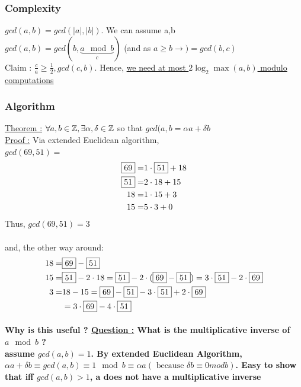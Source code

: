 \documentclass[12pt,a4paper]{article}
\begin{document}
\subsubsection{Complexity}
$gcd(a,b) = gcd(|a|,|b|)$. We can assume a,b \\
$gcd(a,b) = gcd(b,\underbrace{a\mod b}_{c})$ (and as $a\geq b \to ) = gcd(b,c)$\\
Claim : $\frac{c}{a} \geq \frac{1}{2}, gcd(c,b)$. Hence, \underline{we need at most $2\log_2 \max(a,b)$ modulo computations}
\subsubsection{Algorithm}
\underline{Theorem :} $\forall a,b \in \mathbb{Z}, \exists \alpha, \delta \in \mathbb{Z}$ so that $gcd(a,b= \alpha a + \delta b$\\
\underline{Proof :} Via extended Euclidean algorithm,\\
$gcd(69,51) =$
\begin{align*}
\fbox{69} =& 1\cdot \fbox{51}+ 18\\
\fbox{51} =& 2\cdot 18 + 15\\
18 =& 1\cdot 15+ 3\\
15 =& 5 \cdot 3  + 0
\end{align*}
Thus, $gcd(69,51) = 3$\\
\\
and, the other way around:
\begin{align*}
18 =& \fbox{69}-\fbox{51}\\
15 = & \fbox{51} - 2 \cdot 18 = \fbox{51}-2\cdot(\fbox{69}-\fbox{51}) = 3 \cdot \fbox{51} - 2\cdot \fbox{69}\\
3 =& 18-15 = \fbox{69}-\fbox{51} - 3 \cdot \fbox{51}+ 2\cdot \fbox{69}\\
&=3\cdot\fbox{69}-4\cdot\fbox{51}
\end{align*}

\paragraph{Why is this useful ?
\underline{Question :} What is the multiplicative inverse of $a \mod b$ ?\\
assume $gcd(a,b) = 1$. By extended Euclidean Algorithm, $\alpha a + \delta b \equiv gcd(a,b) \equiv 1 \mod b \equiv \alpha a (\mbox{ because } \delta b \equiv 0 mod b)$. Easy to show that iff $gcd(a,b) > 1$, a does not have a multiplicative inverse}
\end{document}
